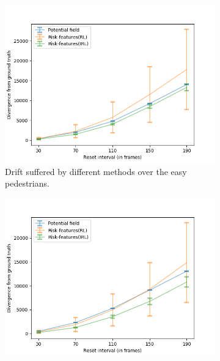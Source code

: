 %
\begin{figure}[htbp]
	\begin{subfigure}{0.5\textwidth}
		\centering
		\includegraphics[width=\linewidth]{plots/ucy_inter_method_new/drift_easy_ucy_inter_method.png}
		\caption{Drift suffered by different methods over the easy pedestrians.}
		\label{fig:inter_method-drift_analysis_easy}
	\end{subfigure}
	\begin{subfigure}{0.5\textwidth}
		\centering
		\includegraphics[width=\linewidth]{plots/ucy_inter_method_new/drift_med_ucy_inter_method.png}

\end{subfigure}
\end{figure}
